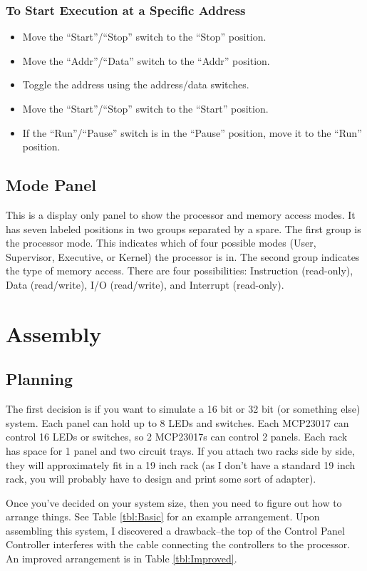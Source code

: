 \documentclass[10pt, openany]{book}
\newcommand{\switch}[2]{``#1''/``#2''}
\newcommand{\position}[1]{``#1''}
\begin{document}
\subsubsection{To Start Execution at a Specific Address}
\begin{itemize}
  \item Move the \switch{Start}{Stop} switch to the \position{Stop} position.
  \item Move the \switch{Addr}{Data} switch to the \position{Addr} position.
  \item Toggle the address using the address/data switches.
  \item Move the \switch{Start}{Stop} switch to the \position{Start} position.
  \item If the \switch{Run}{Pause} switch is in the \position{Pause} position, move it to the \position{Run} position.
\end{itemize}

\subsection{Mode Panel}
This is a display only panel to show the processor and memory access modes.  It has seven labeled positions in two groups separated by a spare.  The first group is the processor mode.  This indicates which of four possible modes (User, Supervisor, Executive, or Kernel) the processor is in.  The second group indicates the type of memory access.  There are four possibilities: Instruction (read-only), Data (read/write), I/O (read/write), and Interrupt (read-only).

\section{Assembly}

\subsection{Planning}
The first decision is if you want to simulate a 16 bit or 32 bit (or something else) system.  Each panel can hold up to 8 LEDs and switches.  Each MCP23017 can control 16 LEDs or switches, so 2 MCP23017s can control 2 panels.  Each rack has space for 1 panel and two circuit trays.  If you attach two racks side by side, they will approximately fit in a 19 inch rack (as I don't have a standard 19 inch rack, you will probably have to design and print some sort of adapter).

Once you've decided on your system size, then you need to figure out how to arrange things.  See Table \ref{tbl:Basic} for an example arrangement.  Upon assembling this system, I discovered a drawback--the top of the Control Panel Controller interferes with the cable connecting the controllers to the processor.  An improved arrangement is in Table \ref{tbl:Improved}.
\end{document}
